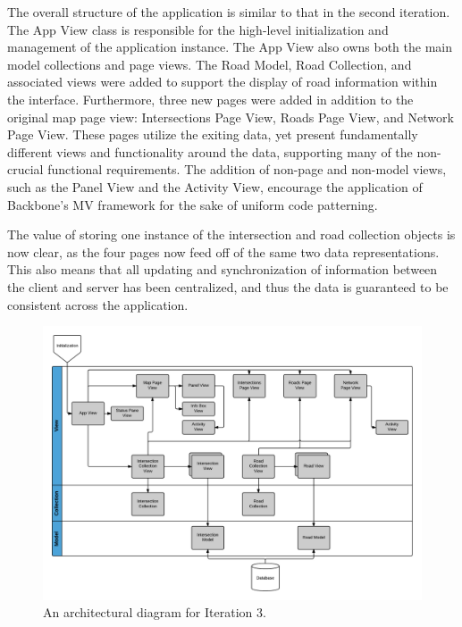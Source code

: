 \documentclass{report}
\begin{document}
The overall structure of the application is similar to that in the second iteration. The App View class is responsible for the high-level initialization and management of the application instance. The App View also owns both the main model collections and page views. The Road Model, Road Collection, and associated views were added to support the display of road information within the interface. Furthermore, three new pages were added in addition to the original map page view: Intersections Page View, Roads Page View, and Network Page View. These pages utilize the exiting data, yet present fundamentally different views and functionality around the data, supporting many of the non-crucial functional requirements. The addition of non-page and non-model views, such as the Panel View and the Activity View, encourage the application of Backbone's MV framework for the sake of uniform code patterning.

The value of storing one instance of the intersection and road collection objects is now clear, as the four pages now feed off of the same two data representations. This also means that all updating and synchronization of information between the client and server has been centralized, and thus the data is guaranteed to be consistent across the application.

\begin{figure}[htbp!]
  \begin{centering}
    \includegraphics[scale=0.25]{figures/Iteration-3.png}
    \caption{An architectural diagram for Iteration 3.}
    \label{fig:iteration3}
  \end{centering}
\end{figure}
\end{document}
